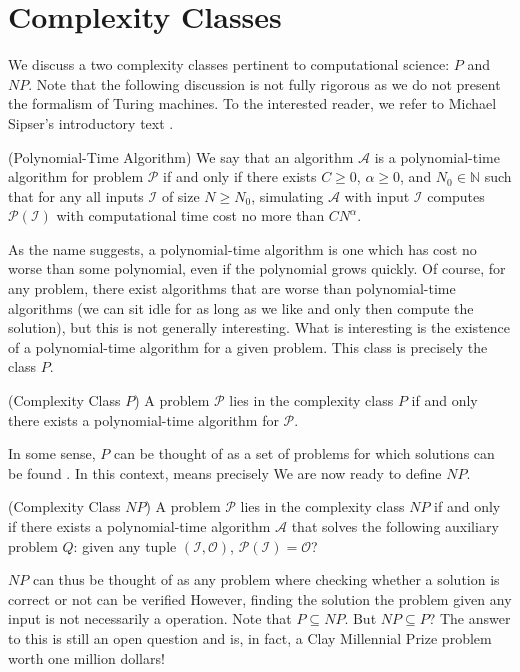 \section{Complexity Classes} \label{sec:18:complexity}
We discuss a two complexity classes pertinent to computational science: $P$ and $NP$. Note that the following discussion is not fully rigorous as we do not present the formalism of Turing machines. To the interested reader, we refer to Michael Sipser's introductory text \cite{sipser1996introduction}. 
\begin{definition}{(Polynomial-Time Algorithm)} \label{def:18:poly}
We say that an algorithm $\mathcal{A}$ is a polynomial-time algorithm for problem $\mathcal{P}$ if and only if there exists $C \geq 0$, $\alpha \geq 0$, and $N_0 \in \mathbb{N}$ such that for any all inputs $\mathcal{I}$ of size $N \geq N_0$, simulating $\mathcal{A}$ with input $\mathcal{I}$ computes $\mathcal{P}(\mathcal{I})$ with computational time cost no more than $C N^{\alpha}$. 
\end{definition}
As the name suggests, a polynomial-time algorithm is one which has cost no worse than some polynomial, even if the polynomial grows quickly. Of course, for any problem, there exist algorithms that are worse than polynomial-time algorithms (we can sit idle for as long as we like and only then compute the solution), but this is not generally interesting. What is interesting is the existence of a polynomial-time algorithm for a given problem. This class is precisely the class $P$.
\begin{definition}{(Complexity Class $P$)} 
A problem $\mathcal{P}$ lies in the complexity class $P$ if and only there exists a polynomial-time algorithm for $\mathcal{P}$. 
\end{definition}
In some sense, $P$ can be thought of as a set of problems for which solutions can be found . In this context,  means precisely  We are now ready to define $NP$.
\begin{definition}{(Complexity Class $NP$)}
A problem $\mathcal{P}$ lies in the complexity class $NP$ if and only if there exists a polynomial-time algorithm $\mathcal{A}$ that solves the following auxiliary problem $Q$: given any tuple $(\mathcal{I}, \mathcal{O})$, $\mathcal{P}(\mathcal{I}) = \mathcal{O}$? 
\end{definition}
$NP$ can thus be thought of as any problem where checking whether a solution is correct or not can be verified  However, finding the solution the problem given any input is not necessarily a  operation. Note that $P \subseteq NP$. But $NP \subseteq P$? The answer to this is still an open question and is, in fact, a Clay Millennial Prize problem worth one million dollars! 

